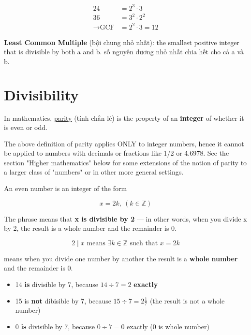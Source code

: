 \[
  \begin{aligned}
    24 &= 2^{3} \cdot 3\\
    36 &= 3^{2} \cdot 2^{2}\\
    \rightarrow \text{GCF} &= 2^{2} \cdot 3 = 12
  \end{aligned}\]
\[\]

\textbf{Least Common Multiple} (bội chung nhỏ nhất): the smallest positive integer that is divisible by both a and b. số nguyên dương nhỏ nhất chia hết cho cả a và b.

\section{Divisibility}

In mathematics, \href{https://en.wikipedia.org/wiki/Parity_%28mathematics%29}{parity} (tính chẳn lẻ) is the property of an \textbf{integer} of whether it is even or odd.

The above definition of parity applies ONLY to integer numbers, hence it cannot be applied to numbers with decimals or fractions like 1/2 or 4.6978. See the section "Higher mathematics" below for some extensions of the notion of parity to a larger class of "numbers" or in other more general settings. 

An even number is an integer of the form

\[x=2k,\ (k \in \mathbb{Z})\]

\vspace{10 mm}

The phrase  means that \textbf{x is divisible by 2} — in other words, when you divide x by 2, the result is a whole number and the remainder is 0.

\[2 \mid x \text{ means } \exists k \in \mathbb{Z} \text{ such that } x = 2k\]

 means when you divide one number by another the result is a \textbf{whole number} and the remainder is 0.

\begin{itemize}
  \item 14 \textbf{is} divisible by 7, because $14 \div 7 = 2$ \textbf{exactly}
  \item 15 is \textbf{not} dibisible by 7, because $15 \div 7 = 2\frac{1}{7}$ (the result is not a whole number)
  \item 0 \textbf{is} divisible by 7, because $0 \div 7 = 0$ exactly (0 is  whole number)
\end{itemize}


